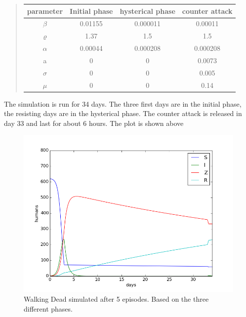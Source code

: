\documentclass[%
twoside,                 %
final,                   %
10pt]{article}
\begin{document}
\begin{quote}
\begin{tabular}{cccc}
\hline
\multicolumn{1}{c}{ parameter } & \multicolumn{1}{c}{ Initial phase } & \multicolumn{1}{c}{ hysterical phase } & \multicolumn{1}{c}{ counter attack } \\
\hline
$\beta$          & 0.01155          & 0.000011         & 0.00011          \\
$\varrho$        & 1.37             & 1.5              & 1.5              \\
$\alpha$         & 0.00044          & 0.000208         & 0.000208         \\
a                & 0                & 0                & 0.0073           \\
$\sigma$         & 0                & 0                & 0.005            \\
$\mu$            & 0                & 0                & 0.14             \\
\hline
\end{tabular}
\end{quote}

\noindent

The simulation is run for 34 days. The three first days are in the initial phase, the resisting days are in the hysterical phase. The counter attack is released in day 33 and last for about 6 hours. The plot is shown above   


\begin{figure}[ht]
  \centerline{\includegraphics[width=0.9\linewidth]{plots/WD_zombie_all_phases_1.png}}
  \caption{
  Walking Dead simulated after 5 episodes. Based on the three different phases.
  }
\end{figure}
\end{document}
